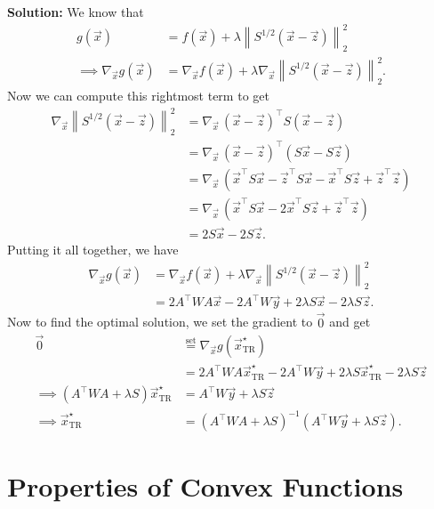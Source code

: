 \documentclass[10pt]{article}
\begin{document}
\begin{enumerate}[label=(\alph*)]
    \textbf{Solution:} We know that
    \begin{align}
        g(\vec{x}) &= f(\vec{x}) + \lambda \left\| S^{1/2}(\vec{x} - \vec{z}) \right\|_2^2 \\
        \implies \nabla_{\vec{x}} g(\vec{x}) &= \nabla_{\vec{x}} f(\vec{x}) + \lambda \nabla_{\vec{x}} \left\| S^{1/2}(\vec{x} - \vec{z}) \right\|_2^2.
    \end{align}
    Now we can compute this rightmost term to get
    \begin{align}
        \nabla_{\vec{x}} \left\| S^{1/2}(\vec{x} - \vec{z}) \right\|_2^2
        &= \nabla_{\vec{x}}\, (\vec{x} - \vec{z})^\top S (\vec{x} - \vec{z}) \\
        &= \nabla_{\vec{x}}\, (\vec{x} - \vec{z})^\top (S\vec{x} - S\vec{z}) \\
        &= \nabla_{\vec{x}}\, (\vec{x}^\top S \vec{x} - \vec{z}^\top S \vec{x} - \vec{x}^\top S \vec{z} + \vec{z}^\top \vec{z}) \\
        &= \nabla_{\vec{x}}\, (\vec{x}^\top S \vec{x} - 2\vec{x}^\top S \vec{z} + \vec{z}^\top \vec{z}) \\
        &= 2S\vec{x} - 2S\vec{z}.
    \end{align}
    Putting it all together, we have
    \begin{align}
        \nabla_{\vec{x}} g(\vec{x}) &= \nabla_{\vec{x}} f(\vec{x}) + \lambda \nabla_{\vec{x}} \left\| S^{1/2}(\vec{x} - \vec{z}) \right\|_2^2 \\
        &= 2A^\top W A \vec{x} - 2A^\top W \vec{y} + 2\lambda S \vec{x} - 2\lambda S \vec{z}.
    \end{align}
    Now to find the optimal solution, we set the gradient to $\vec{0}$ and get
    \begin{align}
        \vec{0} &\stackrel{\text{set}}{=} \nabla_{\vec{x}} g(\vec{x}^\star_{\mathrm{TR}}) \\
        &= 2A^\top W A \vec{x}^\star_{\mathrm{TR}} - 2A^\top W \vec{y} + 2\lambda S \vec{x}^\star_{\mathrm{TR}} - 2\lambda S \vec{z} \\
        \implies (A^\top W A + \lambda S) \vec{x}^\star_{\mathrm{TR}} &= A^\top W \vec{y} + \lambda S \vec{z} \\
        \implies \vec{x}^\star_{\mathrm{TR}} &= (A^\top W A + \lambda S)^{-1}(A^\top W \vec{y} + \lambda S \vec{z}).
    \end{align}
\end{enumerate}

\section{Properties of Convex Functions}
\end{document}
